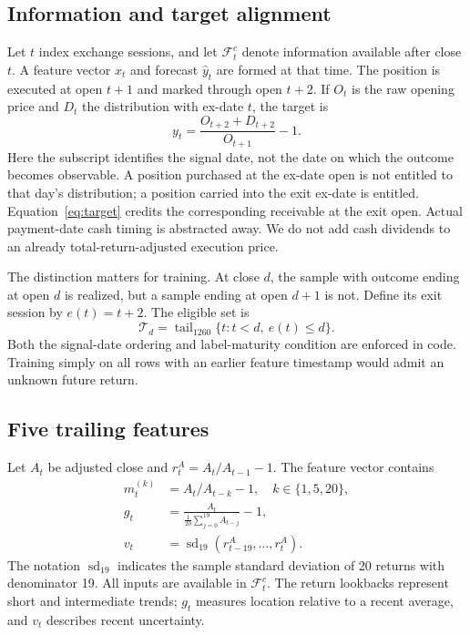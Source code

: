 \subsection{Information and target alignment}
Let $t$ index exchange sessions, and let $\mathcal F_t^c$ denote information available after close $t$. A feature vector $x_t$ and forecast $\widehat y_t$ are formed at that time. The position is executed at open $t+1$ and marked through open $t+2$. If $O_t$ is the raw opening price and $D_t$ the distribution with ex-date $t$, the target is
\begin{equation}
 y_t = \frac{O_{t+2}+D_{t+2}}{O_{t+1}}-1.
 \label{eq:target}
\end{equation}
Here the subscript identifies the signal date, not the date on which the outcome becomes observable. A position purchased at the ex-date open is not entitled to that day's distribution; a position carried into the exit ex-date is entitled. Equation~\eqref{eq:target} credits the corresponding receivable at the exit open. Actual payment-date cash timing is abstracted away. We do not add cash dividends to an already total-return-adjusted execution price.

The distinction matters for training. At close $d$, the sample with outcome ending at open $d$ is realized, but a sample ending at open $d+1$ is not. Define its exit session by $e(t)=t+2$. The eligible set is
\begin{equation}
 \mathcal T_d=\operatorname{tail}_{1260}
 \{t:t<d,\ e(t)\le d\}.
 \label{eq:eligible}
\end{equation}
Both the signal-date ordering and label-maturity condition are enforced in code. Training simply on all rows with an earlier feature timestamp would admit an unknown future return.

\subsection{Five trailing features}
Let $A_t$ be adjusted close and $r_t^A=A_t/A_{t-1}-1$. The feature vector contains
\begin{align}
 m_t^{(k)} &= A_t/A_{t-k}-1, \quad k\in\{1,5,20\},\label{eq:mom}\\
 g_t &= \frac{A_t}{\frac1{20}\sum_{j=0}^{19}A_{t-j}}-1,\label{eq:ma}\\
 v_t &= \operatorname{sd}_{19}(r^A_{t-19},\ldots,r^A_t).
 \label{eq:vol}
\end{align}
The notation $\operatorname{sd}_{19}$ indicates the sample standard deviation of 20 returns with denominator 19. All inputs are available in $\mathcal F_t^c$. The return lookbacks represent short and intermediate trends; $g_t$ measures location relative to a recent average, and $v_t$ describes recent uncertainty.

